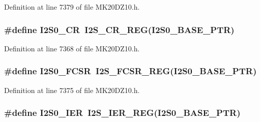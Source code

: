 Definition at line 7379 of file M\+K20\+D\+Z10.\+h.

\subsubsection[{\texorpdfstring{I2\+S0\+\_\+\+CR}{I2S0_CR}}]{\setlength{\rightskip}{0pt plus 5cm}\#define I2\+S0\+\_\+\+CR~{\bf I2\+S\+\_\+\+C\+R\+\_\+\+R\+EG}({\bf I2\+S0\+\_\+\+B\+A\+S\+E\+\_\+\+P\+TR})}\hypertarget{group___i2_s___register___accessor___macros_gaabb58430b32ccfae58161c06b1f23380}{}\label{group___i2_s___register___accessor___macros_gaabb58430b32ccfae58161c06b1f23380}


Definition at line 7368 of file M\+K20\+D\+Z10.\+h.

\subsubsection[{\texorpdfstring{I2\+S0\+\_\+\+F\+C\+SR}{I2S0_FCSR}}]{\setlength{\rightskip}{0pt plus 5cm}\#define I2\+S0\+\_\+\+F\+C\+SR~{\bf I2\+S\+\_\+\+F\+C\+S\+R\+\_\+\+R\+EG}({\bf I2\+S0\+\_\+\+B\+A\+S\+E\+\_\+\+P\+TR})}\hypertarget{group___i2_s___register___accessor___macros_ga3c922096b43a32a2ac5ff5a6b35a2c31}{}\label{group___i2_s___register___accessor___macros_ga3c922096b43a32a2ac5ff5a6b35a2c31}


Definition at line 7375 of file M\+K20\+D\+Z10.\+h.

\subsubsection[{\texorpdfstring{I2\+S0\+\_\+\+I\+ER}{I2S0_IER}}]{\setlength{\rightskip}{0pt plus 5cm}\#define I2\+S0\+\_\+\+I\+ER~{\bf I2\+S\+\_\+\+I\+E\+R\+\_\+\+R\+EG}({\bf I2\+S0\+\_\+\+B\+A\+S\+E\+\_\+\+P\+TR})}\hypertarget{group___i2_s___register___accessor___macros_gacbe4bc997180791bb0e2e8d751551be6}{}\label{group___i2_s___register___accessor___macros_gacbe4bc997180791bb0e2e8d751551be6}


